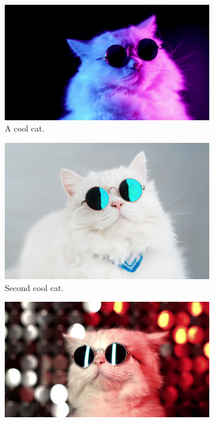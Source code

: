 \documentclass{article}
\begin{document}
\begin{figure}[h!]
\centering
\begin{subfigure}[b]{0.3\linewidth}
	\includegraphics[width=\linewidth]{cool_cat.jpg}
	\caption{A cool cat.}
\end{subfigure}
\begin{subfigure}[b]{0.3\linewidth}
	\includegraphics[width=\linewidth]{another_cool_cat.jpg}
	\caption{Second cool cat.}
\end{subfigure}
\begin{subfigure}[b]{0.3\linewidth}
	\includegraphics[width=\linewidth]{third_cool_cat.jpg}

\end{subfigure}
\end{figure}
\end{document}
